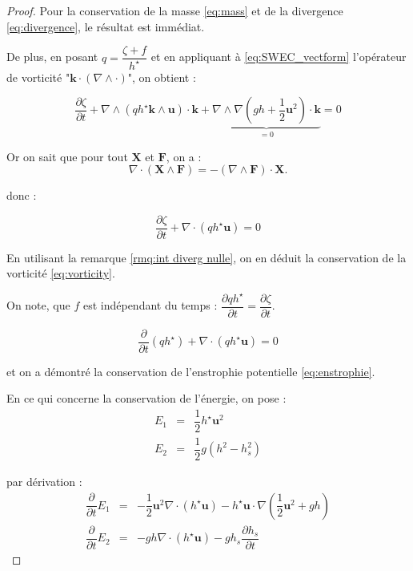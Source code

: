\begin{proof}
Pour la conservation de la masse \eqref{eq:mass} et de la divergence \eqref{eq:divergence}, le résultat est immédiat.

De plus, en posant $q = \dfrac{\zeta+f}{h^{\star}}$ et en appliquant à \eqref{eq:SWEC_vectform} l'opérateur de vorticité "$\mathbf{k} \cdot \left( \nabla \wedge \cdot \right)$", on obtient :

$$
\dfrac{\partial \zeta}{\partial t}+\nabla \wedge \left( q h^{\star} \mathbf{k} \wedge \mathbf{u} \right) \cdot\mathbf{k} + \underbrace{\nabla \wedge \nabla \left( gh + \dfrac{1}{2}\mathbf{u}^2 \right) \cdot \mathbf{k}}_{=0} = 0 
$$

Or on sait que pour tout $\mathbf{X}$ et $\mathbf{F}$, on a :
\begin{equation}
\nabla \cdot \left( \mathbf{X} \wedge \mathbf{F} \right) = - \left( \nabla \wedge \mathbf{F} \right) \cdot \mathbf{X}.
\end{equation}

donc :

$$
\dfrac{ \partial \zeta}{\partial t} + \nabla \cdot \left( q h^{\star} \mathbf{u} \right) = 0
$$

En utilisant la remarque \ref{rmq:int diverg nulle}, on en déduit la conservation de la vorticité \eqref{eq:vorticity}.

On note, que $f$ est indépendant du temps : $\dfrac{\partial q h^{\star}}{\partial t
} = \dfrac{\partial \zeta}{\partial t}$.

$$
\dfrac{\partial}{\partial t} \left( q h^{\star} \right) + \nabla \cdot \left( q h^{\star} \mathbf{u} \right) = 0
$$

et on a démontré la conservation de l'enstrophie potentielle \eqref{eq:enstrophie}.

En ce qui concerne la conservation de l'énergie, on pose :
\begin{equation}
\begin{array}{rcl}
E_1 & = & \dfrac{1}{2} h^{\star} \mathbf{u}^2 \\
E_2 & = & \dfrac{1}{2} g \left( h^2 - h_s^2 \right)
\end{array}
\end{equation}

par dérivation :
\begin{equation}
\begin{array}{rcl}
\dfrac{\partial}{\partial t} E_1 & = & -\dfrac{1}{2} \mathbf{u}^2 \nabla \cdot \left( h^{\star} \mathbf{u} \right) - h^{\star} \mathbf{u} \cdot \nabla \left( \dfrac{1}{2} \mathbf{u}^2 + gh \right) \\
\dfrac{\partial}{\partial t} E_2 & = & - gh \nabla \cdot \left( h^{\star} \mathbf{u} \right) - g h_s \dfrac{\partial h_s}{\partial t} 
\end{array}
\end{equation}


\end{proof}
